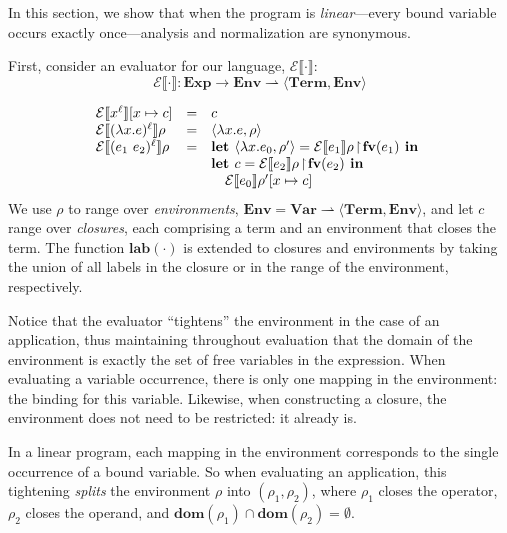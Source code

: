 \documentclass{llncs}
\newcommand\fv[1]{\ensuremath{\mathbf{fv}(#1)}}
\newcommand\lab[1]{\ensuremath{\mathbf{lab}(#1)}}
\newcommand\dom[1]{\ensuremath{\mathbf{dom}(#1)}}
\newcommand\ev[1]{\ensuremath{\mathcal{E}\sem{#1}}}
\newcommand\sem[1]{\ensuremath{\llbracket #1 \rrbracket}}
\newcommand\Term{\mathbf{Term}}
\newcommand\Exp{\mathbf{Exp}}
\newcommand\Env{\mathbf{Env}}
\newcommand\Var{\mathbf{Var}}
\newcommand\restrict{\ensuremath{\!\upharpoonright\!}}
\begin{document}
In this section, we show that when the program is {\em linear}---every
bound variable occurs exactly once---analysis and normalization are
synonymous.

First, consider an evaluator for our language, $\ev\cdot$:
\begin{displaymath}
\ev\cdot : \Exp \rightarrow \Env \rightharpoonup \langle \Term, \Env\rangle
\end{displaymath}

\begin{displaymath}
\begin{array}{lcl}
\ev{x^\ell}[x \mapsto c]               & = & c\\
\ev{(\lambda x.e)^\ell}\rho & = & \langle\lambda x.e,\rho\rangle \\
\ev{(e_1\ e_2)^\ell}\rho & = &
       \mbox{\bf let }\langle\lambda x.e_0,\rho'\rangle = 
                      \ev{e_1}\rho\restrict\fv{e_1}\mbox{\bf\ in }\\
\ &\ & \mbox{\bf let }c = 
                      \ev{e_2}\rho\restrict\fv{e_2}\mbox{\bf\ in }\\
\ &\ &   \quad   \ev{e_0}{\rho'[x \mapsto c]}
\end{array}
\end{displaymath}
We use $\rho$ to range over {\em environments}, $\Env = \Var
\rightharpoonup \langle\Term,\Env\rangle$, and let $c$ range over {\em
closures}, each comprising a term and an environment that closes the
term.  The function $\lab{\cdot}$ is extended to closures and
environments by taking the union of all labels in the closure or in
the range of the environment, respectively.






Notice that the evaluator ``tightens'' the environment in the case of
an application, thus maintaining throughout evaluation that the domain
of the environment is exactly the set of free variables in the
expression.  When evaluating a variable occurrence, there is only one
mapping in the environment: the binding for this variable. Likewise,
when constructing a closure, the environment does not need to be
restricted: it already is.

In a linear program, each mapping in the environment corresponds to
the single occurrence of a bound variable.  So when evaluating an
application, this tightening {\em splits} the environment $\rho$ into
$(\rho_1,\rho_2)$, where $\rho_1$ closes the operator, $\rho_2$ closes
the operand, and $\dom{\rho_1} \cap \dom{\rho_2} = \emptyset$.
\end{document}
